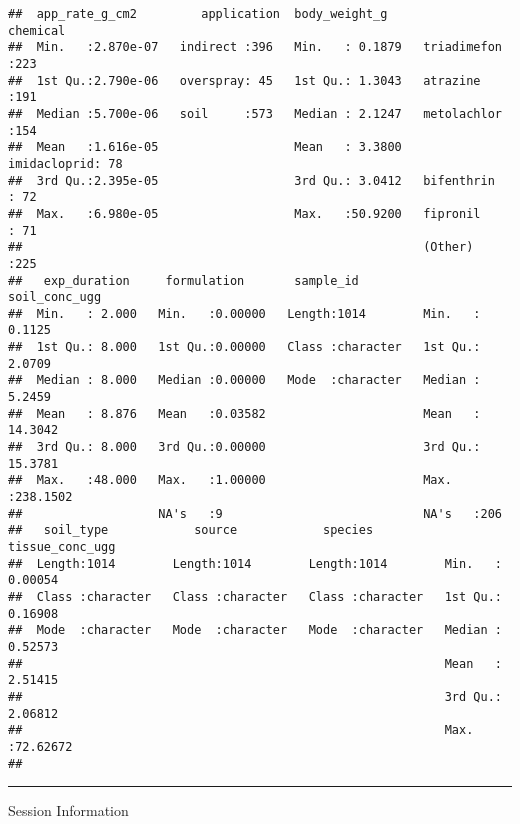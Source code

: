 \documentclass[
]{article}
\begin{document}
\begin{verbatim}
##  app_rate_g_cm2         application  body_weight_g             chemical  
##  Min.   :2.870e-07   indirect :396   Min.   : 0.1879   triadimefon :223  
##  1st Qu.:2.790e-06   overspray: 45   1st Qu.: 1.3043   atrazine    :191  
##  Median :5.700e-06   soil     :573   Median : 2.1247   metolachlor :154  
##  Mean   :1.616e-05                   Mean   : 3.3800   imidacloprid: 78  
##  3rd Qu.:2.395e-05                   3rd Qu.: 3.0412   bifenthrin  : 72  
##  Max.   :6.980e-05                   Max.   :50.9200   fipronil    : 71  
##                                                        (Other)     :225  
##   exp_duration     formulation       sample_id         soil_conc_ugg     
##  Min.   : 2.000   Min.   :0.00000   Length:1014        Min.   :  0.1125  
##  1st Qu.: 8.000   1st Qu.:0.00000   Class :character   1st Qu.:  2.0709  
##  Median : 8.000   Median :0.00000   Mode  :character   Median :  5.2459  
##  Mean   : 8.876   Mean   :0.03582                      Mean   : 14.3042  
##  3rd Qu.: 8.000   3rd Qu.:0.00000                      3rd Qu.: 15.3781  
##  Max.   :48.000   Max.   :1.00000                      Max.   :238.1502  
##                   NA's   :9                            NA's   :206       
##   soil_type            source            species          tissue_conc_ugg   
##  Length:1014        Length:1014        Length:1014        Min.   : 0.00054  
##  Class :character   Class :character   Class :character   1st Qu.: 0.16908  
##  Mode  :character   Mode  :character   Mode  :character   Median : 0.52573  
##                                                           Mean   : 2.51415  
##                                                           3rd Qu.: 2.06812  
##                                                           Max.   :72.62672  
## 
\end{verbatim}

\begin{center}\rule{0.5\linewidth}{0.5pt}\end{center}

Session Information
\end{document}
